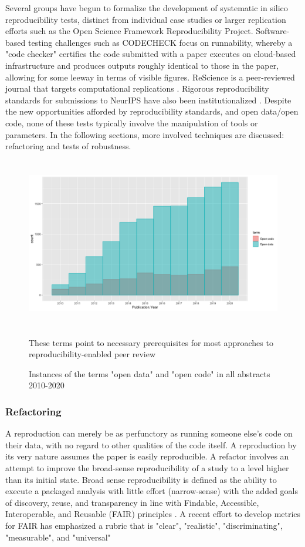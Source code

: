 \documentclass{drexelthesis}
\begin{document}
Several groups have begun to formalize the development of systematic in silico reproducibility tests, distinct from individual case studies or larger replication efforts such as the Open Science Framework Reproducibility Project. Software-based testing challenges such as CODECHECK \cite{Eglen2019-qm} focus on runnability, whereby a "code checker" certifies the code submitted with a paper executes on cloud-based infrastructure and produces outputs roughly identical to those in the paper, allowing for some leeway in terms of visible figures. ReScience is a peer-reviewed journal that targets computational replications \cite{Rougier2017-ys}. Rigorous reproducibility standards for submissions to NeurIPS have also been institutionalized \cite{Pineau2020-bs}. Despite the new opportunities afforded by reproducibility standards, and open data/open code, none of these tests typically involve the manipulation of tools or parameters. In the following sections, more involved techniques are discussed: refactoring and tests of robustness.

\begin{figure}[h!]
	\centering
	\includegraphics[width=13.76cm,height=7.47cm]{./images/odoc.png}
	\caption{Instances of the terms "open data" and "open code" in all abstracts 2010-2020}
	\medskip
\small
These terms point to necessary prerequisites for most approaches to reproducibility-enabled peer review
	\label{odoc}
\end{figure}

\subsubsection{Refactoring}

A reproduction can merely be as perfunctory as running someone else's code on their data, with no regard to other qualities of the code itself. A reproduction by its very nature assumes the paper is easily reproducible. A refactor involves an attempt to improve the broad-sense reproducibility of a study to a level higher than its initial state. Broad sense reproducibility is defined as the ability to execute a packaged analysis with little effort (narrow-sense) with the added goals of discovery, reuse, and transparency in line with Findable, Accessible, Interoperable, and Reusable (FAIR) principles \cite{Wilkinson2016-qr}. A recent effort to develop metrics for FAIR has emphasized a rubric that is "clear", "realistic", "discriminating", "measurable", and "universal" \cite{Wilkinson2017-hf}
\end{document}
